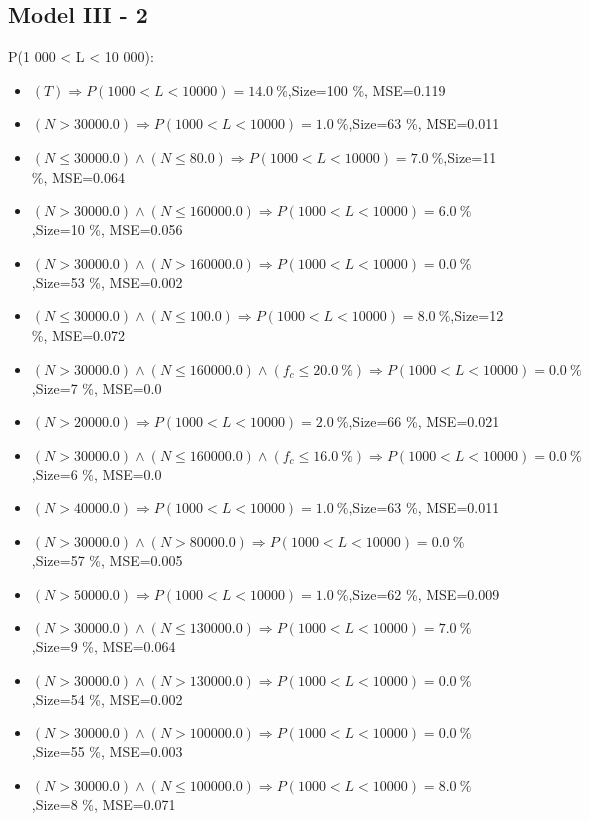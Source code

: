 \documentclass[numbered]{CSL}
\begin{document}
\subsection{Model III - 2}
P(1 000 < L < 10 000):
\begin{itemize}
\item $(T) \Rightarrow P(1 000 < L < 10 000) = 14.0~\%$,\hfill Size=100 \%, MSE=0.119
\item $(N > 30000.0) \Rightarrow P(1 000 < L < 10 000) = 1.0~\%$,\hfill Size=63 \%, MSE=0.011
\item $(N \leq 30000.0) \land (N \leq 80.0) \Rightarrow P(1 000 < L < 10 000) = 7.0~\%$,\hfill Size=11 \%, MSE=0.064
\item $(N > 30000.0) \land (N \leq 160000.0) \Rightarrow P(1 000 < L < 10 000) = 6.0~\%$,\hfill Size=10 \%, MSE=0.056
\item $(N > 30000.0) \land (N > 160000.0) \Rightarrow P(1 000 < L < 10 000) = 0.0~\%$,\hfill Size=53 \%, MSE=0.002
\item $(N \leq 30000.0) \land (N \leq 100.0) \Rightarrow P(1 000 < L < 10 000) = 8.0~\%$,\hfill Size=12 \%, MSE=0.072
\item $(N > 30000.0) \land (N \leq 160000.0) \land (f_c \leq 20.0~\%) \Rightarrow P(1 000 < L < 10 000) = 0.0~\%$,\hfill Size=7 \%, MSE=0.0
\item $(N > 20000.0) \Rightarrow P(1 000 < L < 10 000) = 2.0~\%$,\hfill Size=66 \%, MSE=0.021
\item $(N > 30000.0) \land (N \leq 160000.0) \land (f_c \leq 16.0~\%) \Rightarrow P(1 000 < L < 10 000) = 0.0~\%$,\hfill Size=6 \%, MSE=0.0
\item $(N > 40000.0) \Rightarrow P(1 000 < L < 10 000) = 1.0~\%$,\hfill Size=63 \%, MSE=0.011
\item $(N > 30000.0) \land (N > 80000.0) \Rightarrow P(1 000 < L < 10 000) = 0.0~\%$,\hfill Size=57 \%, MSE=0.005
\item $(N > 50000.0) \Rightarrow P(1 000 < L < 10 000) = 1.0~\%$,\hfill Size=62 \%, MSE=0.009
\item $(N > 30000.0) \land (N \leq 130000.0) \Rightarrow P(1 000 < L < 10 000) = 7.0~\%$,\hfill Size=9 \%, MSE=0.064
\item $(N > 30000.0) \land (N > 130000.0) \Rightarrow P(1 000 < L < 10 000) = 0.0~\%$,\hfill Size=54 \%, MSE=0.002
\item $(N > 30000.0) \land (N > 100000.0) \Rightarrow P(1 000 < L < 10 000) = 0.0~\%$,\hfill Size=55 \%, MSE=0.003
\item $(N > 30000.0) \land (N \leq 100000.0) \Rightarrow P(1 000 < L < 10 000) = 8.0~\%$,\hfill Size=8 \%, MSE=0.071

\end{itemize}
\end{document}

